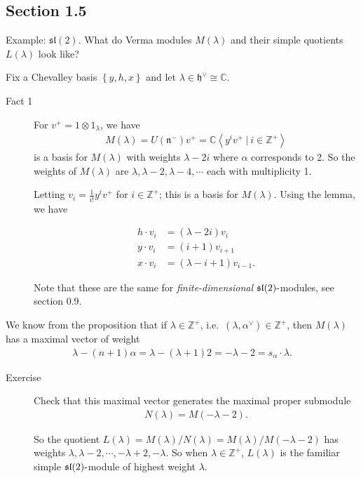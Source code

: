 \documentclass[11pt]{scrartcl}
\theoremstyle{definition}
\theoremstyle{theorem}
\theoremstyle{proof}
\theoremstyle{definition}
\theoremstyle{break}
\theoremstyle{problem}
\providecommand{\tightlist}{%
  \setlength{\itemsep}{0pt}\setlength{\parskip}{0pt}}
\newcommand{\CC}[0]{{\mathbb{C}}}
\newcommand{\ZZ}[0]{{\mathbb{Z}}}
\newcommand{\dash}[0]{{\hbox{-}}}
\newcommand{\dual}[0]{^\vee}
\newcommand{\generators}[1]{\left\langle{#1}\right\rangle}
\newcommand{\lieh}[0]{{\mathfrak{h}}}
\newcommand{\lien}[0]{{\mathfrak{n}}}
\newcommand{\liesl}[0]{{\mathfrak{sl}}}
\newcommand{\suchthat}[0]{{~\mathrel{\Big|}~}}
\newcommand{\tensor}[0]{\otimes}
\newcommand{\theset}[1]{\left\{{#1}\right\}}
\begin{document}
\hypertarget{section-1.5}{%
\subsection{Section 1.5}\label{section-1.5}}

Example: \(\liesl(2)\). What do Verma modules \(M(\lambda)\) and their
simple quotients \(L(\lambda)\) look like?

Fix a Chevalley basis \(\theset{y,h,x}\) and let
\(\lambda \in \lieh\dual \cong \CC\).

\begin{description}
\item[Fact 1]
For \(v^+ = 1\tensor 1_\lambda\), we have
\begin{align*}M(\lambda) = U(\lien^-) v^+ = \CC \generators{y^i v^+ \suchthat i\in \ZZ^+}\end{align*}
is a basis for \(M(\lambda)\) with weights \(\lambda - 2i\) where
\(\alpha\) corresponds to 2. So the weights of \(M(\lambda)\) are
\(\lambda, \lambda-2, \lambda-4, \cdots\) each with multiplicity 1.

Letting \(v_i = \frac 1 {i!} y^i v^+\) for \(i\in \ZZ^+\); this is a
basis for \(M(\lambda)\). Using the lemma, we have

\begin{align*}
h\cdot v_i &= (\lambda - 2i) v_i \\
y \cdot v_i &= (i+1) v_{i+1} \\
x\cdot v_i &= (\lambda - i + 1)v_{i-1} 
.\end{align*}

Note that these are the same for \emph{finite-dimensional}
\(\liesl(2)\dash\)modules, see section 0.9.
\end{description}

\begin{description}
\tightlist
\item[Fact (2)]
We know from the proposition that if \(\lambda \in \ZZ^+\),
i.e.~\((\lambda, \alpha\dual) \in \ZZ^+\), then \(M(\lambda)\) has a
maximal vector of weight
\begin{align*}\lambda - (n+1)\alpha = \lambda - (\lambda+1)2 = -\lambda-2 = s_\alpha \cdot \lambda.\end{align*}
\end{description}

\begin{description}
\item[Exercise]
Check that this maximal vector generates the maximal proper submodule
\begin{align*}N(\lambda) = M(-\lambda - 2).\end{align*}

So the quotient
\(L(\lambda) = M(\lambda) / N(\lambda) = M(\lambda) / M(-\lambda - 2)\)
has weights \(\lambda, \lambda-2, \cdots, -\lambda+2, -\lambda\). So
when \(\lambda \in \ZZ^+\), \(L(\lambda)\) is the familiar simple
\(\liesl(2)\dash\)module of highest weight \(\lambda\).
\end{description}
\end{document}
